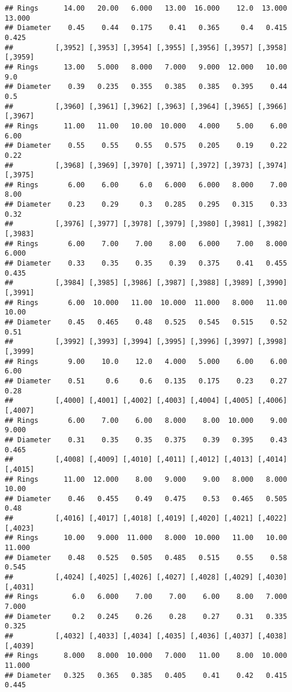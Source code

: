\documentclass[
]{article}
\begin{document}
\begin{verbatim}
## Rings      14.00   20.00   6.000   13.00  16.000    12.0  13.000  13.000
## Diameter    0.45    0.44   0.175    0.41   0.365     0.4   0.415   0.425
##          [,3952] [,3953] [,3954] [,3955] [,3956] [,3957] [,3958] [,3959]
## Rings      13.00   5.000   8.000   7.000   9.000  12.000   10.00     9.0
## Diameter    0.39   0.235   0.355   0.385   0.385   0.395    0.44     0.5
##          [,3960] [,3961] [,3962] [,3963] [,3964] [,3965] [,3966] [,3967]
## Rings      11.00   11.00   10.00  10.000   4.000    5.00    6.00    6.00
## Diameter    0.55    0.55    0.55   0.575   0.205    0.19    0.22    0.22
##          [,3968] [,3969] [,3970] [,3971] [,3972] [,3973] [,3974] [,3975]
## Rings       6.00    6.00     6.0   6.000   6.000   8.000    7.00    8.00
## Diameter    0.23    0.29     0.3   0.285   0.295   0.315    0.33    0.32
##          [,3976] [,3977] [,3978] [,3979] [,3980] [,3981] [,3982] [,3983]
## Rings       6.00    7.00    7.00    8.00   6.000    7.00   8.000   6.000
## Diameter    0.33    0.35    0.35    0.39   0.375    0.41   0.455   0.435
##          [,3984] [,3985] [,3986] [,3987] [,3988] [,3989] [,3990] [,3991]
## Rings       6.00  10.000   11.00  10.000  11.000   8.000   11.00   10.00
## Diameter    0.45   0.465    0.48   0.525   0.545   0.515    0.52    0.51
##          [,3992] [,3993] [,3994] [,3995] [,3996] [,3997] [,3998] [,3999]
## Rings       9.00    10.0    12.0   4.000   5.000    6.00    6.00    6.00
## Diameter    0.51     0.6     0.6   0.135   0.175    0.23    0.27    0.28
##          [,4000] [,4001] [,4002] [,4003] [,4004] [,4005] [,4006] [,4007]
## Rings       6.00    7.00    6.00   8.000    8.00  10.000    9.00   9.000
## Diameter    0.31    0.35    0.35   0.375    0.39   0.395    0.43   0.465
##          [,4008] [,4009] [,4010] [,4011] [,4012] [,4013] [,4014] [,4015]
## Rings      11.00  12.000    8.00   9.000    9.00   8.000   8.000   10.00
## Diameter    0.46   0.455    0.49   0.475    0.53   0.465   0.505    0.48
##          [,4016] [,4017] [,4018] [,4019] [,4020] [,4021] [,4022] [,4023]
## Rings      10.00   9.000  11.000   8.000  10.000   11.00   10.00  11.000
## Diameter    0.48   0.525   0.505   0.485   0.515    0.55    0.58   0.545
##          [,4024] [,4025] [,4026] [,4027] [,4028] [,4029] [,4030] [,4031]
## Rings        6.0   6.000    7.00    7.00    6.00    8.00   7.000   7.000
## Diameter     0.2   0.245    0.26    0.28    0.27    0.31   0.335   0.325
##          [,4032] [,4033] [,4034] [,4035] [,4036] [,4037] [,4038] [,4039]
## Rings      8.000   8.000  10.000   7.000   11.00    8.00  10.000  11.000
## Diameter   0.325   0.365   0.385   0.405    0.41    0.42   0.415   0.445

\end{verbatim}
\end{document}
